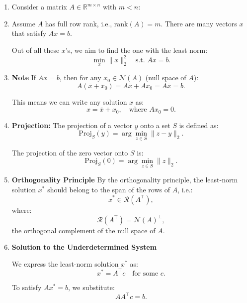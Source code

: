 \begin{derivation}
    \begin{enumerate}
        \item Consider a matrix \( A \in \mathbb{R}^{m \times n} \) with \( m < n \):
        
        \item Assume \( A \) has full row rank, i.e., \(\text{rank}(A) = m\). There are many vectors \( x \) that satisfy \( A x = b \).
        
        Out of all these \( x \)'s, we aim to find the one with the least norm:
        \[
        \min_x \|x\|_2^2 \quad \text{s.t. } A x = b.
        \]
        
        \item \textbf{Note} If \( A \bar{x} = b \), then for any \( x_0 \in \mathcal{N}(A) \) (null space of \( A \)):
        \[
        A (\bar{x} + x_0) = A \bar{x} + A x_0 = A \bar{x} = b.
        \]
        
        This means we can write any solution \( x \) as:
        \[
        x = \bar{x} + x_0, \quad \text{where } A x_0 = 0.
        \]
        
        \item \textbf{Projection:} The projection of a vector \(y\) onto a set \(S\) is defined as:
        \[
        \text{Proj}_S(y) = \arg \min_{z \in S} \|z - y\|_2.
        \]

        The projection of the zero vector onto \(S\) is:
        \[
        \text{Proj}_S(0) = \arg \min_{z \in S} \|z\|_2.
        \]

        \item \textbf{Orthogonality Principle} By the orthogonality principle, the least-norm solution \(x^*\) should belong to the span of the rows of \(A\), i.e.:
        \[
        x^* \in \mathcal{R}(A^\top),
        \]
        where:
        \[
        \mathcal{R}(A^\top) = \mathcal{N}(A)^\perp,
        \]
        the orthogonal complement of the null space of \(A\).

        \item \textbf{Solution to the Underdetermined System}

        We express the least-norm solution \(x^*\) as:
        \[
        x^* = A^\top c \quad \text{for some } c.
        \]

        To satisfy \(A x^* = b\), we substitute:
        \[
        A A^\top c = b.
        \]


\end{enumerate}
\end{derivation}
